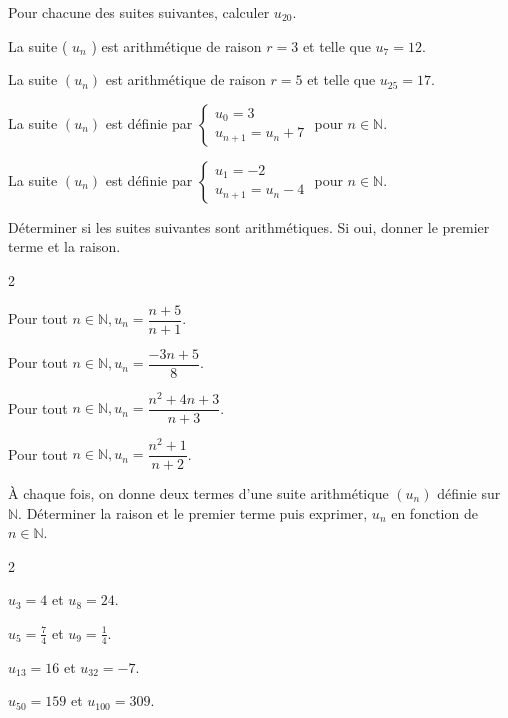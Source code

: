 \documentclass[11pt,a4paper]{article}  %
\begin{document}

Pour chacune des suites suivantes, calculer $u_{20}$.
\begin{enumMet}
	\item La suite ( $u_n$ ) est arithmétique de raison $r=3$ et telle que $u_7=12$.
	\item La suite $\left(u_n\right)$ est arithmétique de raison $r=5$ et telle que $u_{25}=17$.
	\item La suite $\left(u_n\right)$ est définie par $\left\{\begin{array}{l}u_0=3 \\ u_{n+1}=u_n+7\end{array}\right.$ pour $n \in \mathbb{N}$.
	\item La suite $\left(u_n\right)$ est définie par $\left\{\begin{array}{l}u_1=-2 \\ u_{n+1}=u_n-4\end{array}\right.$ pour $n \in \mathbb{N}$.
\end{enumMet}


Déterminer si les suites suivantes sont arithmétiques. Si oui, donner le premier terme et la raison.
\begin{multicols}{2}
	\begin{enumMet}
	\item Pour tout $n \in \mathbb{N}, u_n=\dfrac{n+5}{n+1}$.
	\item Pour tout $n \in \mathbb{N}, u_n=\dfrac{-3 n+5}{8}$.
	\item Pour tout $n \in \mathbb{N}, u_n=\dfrac{n^2+4 n+3}{n+3}$.
	\item Pour tout $n \in \mathbb{N}, u_n=\dfrac{n^2+1}{n+2}$.
\end{enumMet}
\end{multicols}


À chaque fois, on donne deux termes d'une suite arithmétique $\left(u_n\right)$ définie sur $\mathbb{N}$.
Déterminer la raison et le premier terme puis exprimer, $u_n$ en fonction de $n \in \mathbb{N}$.
\begin{multicols}{2}
	\begin{enumMet}
	\item $u_3=4$ et $u_8=24$.
	\item $u_5=\frac{7}{4}$ et $u_9=\frac{1}{4}$.
	\item $u_{13}=16$ et $u_{32}=-7$.
	\item $u_{50}=159$ et $u_{100}=309$.
\end{enumMet}
\end{multicols}
\end{document}
